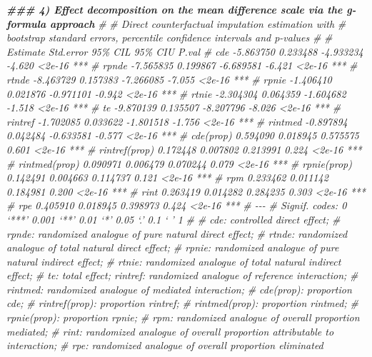 \documentclass[
]{book}
\newenvironment{Shaded}{\begin{snugshade}}{\end{snugshade}}
\newcommand{\CommentTok}[1]{\textcolor[rgb]{0.56,0.35,0.01}{\textit{#1}}}
\newcommand{\DocumentationTok}[1]{\textcolor[rgb]{0.56,0.35,0.01}{\textbf{\textit{#1}}}}
\begin{document}
\begin{Shaded}
\begin{Highlighting}[]
\DocumentationTok{\#\#\# 4) Effect decomposition on the mean difference scale via the g{-}formula approach}
\CommentTok{\#}
\CommentTok{\# Direct counterfactual imputation estimation with}
\CommentTok{\# bootstrap standard errors, percentile confidence intervals and p{-}values}
\CommentTok{\#}
\CommentTok{\#                  Estimate Std.error   95\% CIL 95\% CIU  P.val}
\CommentTok{\#   cde           {-}5.863750  0.233488 {-}4.933234  {-}4.620 \textless{}2e{-}16 ***}
\CommentTok{\#   rpnde         {-}7.565835  0.199867 {-}6.689581  {-}6.421 \textless{}2e{-}16 ***}
\CommentTok{\#   rtnde         {-}8.463729  0.157383 {-}7.266085  {-}7.055 \textless{}2e{-}16 ***}
\CommentTok{\#   rpnie         {-}1.406410  0.021876 {-}0.971101  {-}0.942 \textless{}2e{-}16 ***}
\CommentTok{\#   rtnie         {-}2.304304  0.064359 {-}1.604682  {-}1.518 \textless{}2e{-}16 ***}
\CommentTok{\#   te            {-}9.870139  0.135507 {-}8.207796  {-}8.026 \textless{}2e{-}16 ***}
\CommentTok{\#   rintref       {-}1.702085  0.033622 {-}1.801518  {-}1.756 \textless{}2e{-}16 ***}
\CommentTok{\#   rintmed       {-}0.897894  0.042484 {-}0.633581  {-}0.577 \textless{}2e{-}16 ***}
\CommentTok{\#   cde(prop)      0.594090  0.018945  0.575575   0.601 \textless{}2e{-}16 ***}
\CommentTok{\#   rintref(prop)  0.172448  0.007802  0.213991   0.224 \textless{}2e{-}16 ***}
\CommentTok{\#   rintmed(prop)  0.090971  0.006479  0.070244   0.079 \textless{}2e{-}16 ***}
\CommentTok{\#   rpnie(prop)    0.142491  0.004663  0.114737   0.121 \textless{}2e{-}16 ***}
\CommentTok{\#   rpm            0.233462  0.011142  0.184981   0.200 \textless{}2e{-}16 ***}
\CommentTok{\#   rint           0.263419  0.014282  0.284235   0.303 \textless{}2e{-}16 ***}
\CommentTok{\#   rpe            0.405910  0.018945  0.398973   0.424 \textless{}2e{-}16 ***}
\CommentTok{\#   {-}{-}{-}}
\CommentTok{\#   Signif. codes:  0 ‘***’ 0.001 ‘**’ 0.01 ‘*’ 0.05 ‘.’ 0.1 ‘ ’ 1}
\CommentTok{\#}
\CommentTok{\# cde: controlled direct effect;}
\CommentTok{\# rpnde: randomized analogue of pure natural direct effect;}
\CommentTok{\# rtnde: randomized analogue of total natural direct effect;}
\CommentTok{\# rpnie: randomized analogue of pure natural indirect effect;}
\CommentTok{\# rtnie: randomized analogue of total natural indirect effect;}
\CommentTok{\# te: total effect; rintref: randomized analogue of reference interaction;}
\CommentTok{\# rintmed: randomized analogue of mediated interaction;}
\CommentTok{\# cde(prop): proportion cde;}
\CommentTok{\# rintref(prop): proportion rintref;}
\CommentTok{\# rintmed(prop): proportion rintmed;}
\CommentTok{\# rpnie(prop): proportion rpnie;}
\CommentTok{\# rpm: randomized analogue of overall proportion mediated;}
\CommentTok{\# rint: randomized analogue of overall proportion attributable to interaction;}
\CommentTok{\# rpe: randomized analogue of overall proportion eliminated}
\end{Highlighting}
\end{Shaded}
\end{document}
